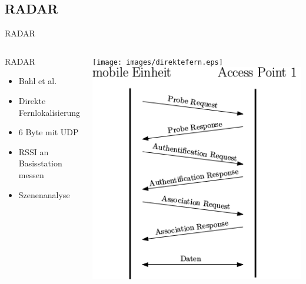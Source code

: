 \documentclass[18pt]{beamer}
\begin{document}
\subsection{RADAR}
\begin{frame}{RADAR}
	\begin{columns}
			\begin{block}{RADAR}
				\begin{itemize}
					\item Bahl et al. \cite{bahl2000radar}
					\item Direkte Fernlokalisierung
					\item 6 Byte mit UDP
					\item RSSI an Basisstation messen
					\item Szenenanalyse
				\end{itemize}
			\end{block}
			\centering
			\texttt{[image: images/direktefern.eps]}
			\includegraphics[width=\textwidth]{images/reupper.png}
	\end{columns}
\end{frame}
\end{document}
